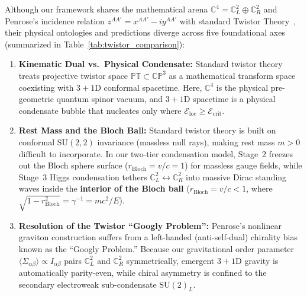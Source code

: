 \documentclass[11pt,a4paper]{article}
\begin{document}
Although our framework shares the mathematical arena $\mathbb{C}^4 = \mathbb{C}^2_L \oplus \mathbb{C}^2_R$ and Penrose's incidence relation $z^{AA'} = x^{AA'} - i y^{AA'}$ with standard Twistor Theory~\cite{Penrose1967,PenroseRindler1984}, their physical ontologies and predictions diverge across five foundational axes (summarized in Table~\ref{tab:twistor_comparison}):
\begin{enumerate}
    \item \textbf{Kinematic Dual vs.\ Physical Condensate:} Standard twistor theory treats projective twistor space $\mathbb{PT} \subset \mathbb{CP}^3$ as a mathematical transform space coexisting with $3+1\text{D}$ conformal spacetime. Here, $\mathbb{C}^4$ is the physical pre-geometric quantum spinor vacuum, and $3+1\text{D}$ spacetime is a physical condensate bubble that nucleates only where $\mathcal{E}_{\text{loc}} \ge \mathcal{E}_{\text{crit}}$.
    \item \textbf{Rest Mass and the Bloch Ball:} Standard twistor theory is built on conformal $\text{SU}(2,2)$ invariance (massless null rays), making rest mass $m > 0$ difficult to incorporate. In our two-tier condensation model, Stage~2 freezes out the Bloch sphere surface ($r_{\text{Bloch}} = v/c = 1$) for massless gauge fields, while Stage~3 Higgs condensation tethers $\mathbb{C}^2_L \leftrightarrow \mathbb{C}^2_R$ into massive Dirac standing waves inside the \textbf{interior of the Bloch ball} ($r_{\text{Bloch}} = v/c < 1$, where $\sqrt{1 - r_{\text{Bloch}}^2} = \gamma^{-1} = mc^2/E$).
    \item \textbf{Resolution of the Twistor ``Googly Problem'':} Penrose's nonlinear graviton construction suffers from a left-handed (anti-self-dual) chirality bias known as the ``Googly Problem.'' Because our gravitational order parameter $\langle\Sigma_{\alpha\beta}\rangle \propto I_{\alpha\beta}$ pairs $\mathbb{C}^2_L$ and $\mathbb{C}^2_R$ symmetrically, emergent $3+1\text{D}$ gravity is automatically parity-even, while chiral asymmetry is confined to the secondary electroweak sub-condensate $\text{SU}(2)_L$.
\end{enumerate}
\end{document}
